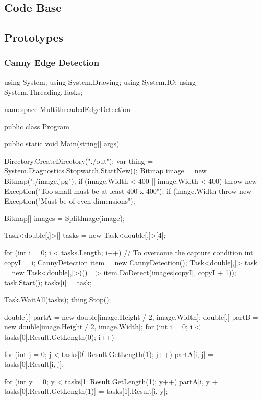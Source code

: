 \begin{flushleft}
    \section{Code Base}
    \subsection{Prototypes}
    \subsubsection{Canny Edge Detection}
    \begin{cscode}
using System;
using System.Drawing;
using System.IO;
using System.Threading.Tasks;

namespace MultithreadedEdgeDetection
{
    public class Program
    {
        public static void Main(string[] args)
        {
            Directory.CreateDirectory("./out");
            var thing = System.Diagnostics.Stopwatch.StartNew();
            Bitmap image = new Bitmap("./image.jpg");
            if (image.Width < 400 || image.Width < 400)
                throw new Exception("Too small must be at least 400 x 400");
            if (image.Width %
                throw new Exception("Must be of even dimensions");

            Bitmap[] images = SplitImage(image);

            Task<double[,]>[] tasks = new Task<double[,]>[4];

            for (int i = 0; i < tasks.Length; i++)
            {
                // To overcome the capture condition
                int copyI = i;
                CannyDetection item = new CannyDetection();
                Task<double[,]> task = new Task<double[,]>(() => item.DoDetect(images[copyI], copyI + 1));
                task.Start();
                tasks[i] = task;
            }

            Task.WaitAll(tasks);
            thing.Stop();

            double[,] partA = new double[image.Height / 2, image.Width];
            double[,] partB = new double[image.Height / 2, image.Width];
            for (int i = 0; i < tasks[0].Result.GetLength(0); i++)
            {
                for (int j = 0; j < tasks[0].Result.GetLength(1); j++)
                    partA[i, j] = tasks[0].Result[i, j];

                for (int y = 0; y < tasks[1].Result.GetLength(1); y++)
                    partA[i, y + tasks[0].Result.GetLength(1)] = tasks[1].Result[i, y];
            }

}}}
\end{cscode}
\end{flushleft}
